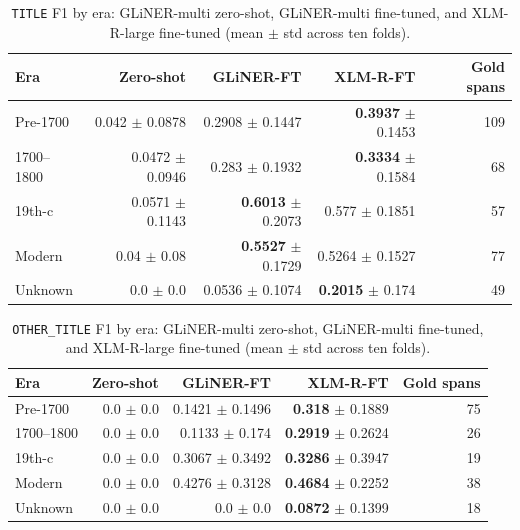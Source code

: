 \begin{table}
  \caption{\texttt{TITLE} F1 by era: GLiNER-multi zero-shot, GLiNER-multi fine-tuned, and XLM-R-large fine-tuned (mean $\pm$ std across ten folds).}
  \label{tab:title-per-era}
  \begin{tabular}{lrrrr}
    \toprule
    Era & Zero-shot & GLiNER-FT & XLM-R-FT & Gold spans \\
    \midrule
    Pre-1700 & 0.042 $\pm$ 0.0878 & 0.2908 $\pm$ 0.1447 & \textbf{0.3937} $\pm$ 0.1453 & 109 \\
    1700--1800 & 0.0472 $\pm$ 0.0946 & 0.283 $\pm$ 0.1932 & \textbf{0.3334} $\pm$ 0.1584 & 68 \\
    19th-c & 0.0571 $\pm$ 0.1143 & \textbf{0.6013} $\pm$ 0.2073 & 0.577 $\pm$ 0.1851 & 57 \\
    Modern & 0.04 $\pm$ 0.08 & \textbf{0.5527} $\pm$ 0.1729 & 0.5264 $\pm$ 0.1527 & 77 \\
    Unknown & 0.0 $\pm$ 0.0 & 0.0536 $\pm$ 0.1074 & \textbf{0.2015} $\pm$ 0.174 & 49 \\
    \bottomrule
  \end{tabular}
\end{table}

\begin{table}
  \caption{\texttt{OTHER\_TITLE} F1 by era: GLiNER-multi zero-shot, GLiNER-multi fine-tuned, and XLM-R-large fine-tuned (mean $\pm$ std across ten folds).}
  \label{tab:other-title-per-era}
  \begin{tabular}{lrrrr}
    \toprule
    Era & Zero-shot & GLiNER-FT & XLM-R-FT & Gold spans \\
    \midrule
    Pre-1700 & 0.0 $\pm$ 0.0 & 0.1421 $\pm$ 0.1496 & \textbf{0.318} $\pm$ 0.1889 & 75 \\
    1700--1800 & 0.0 $\pm$ 0.0 & 0.1133 $\pm$ 0.174 & \textbf{0.2919} $\pm$ 0.2624 & 26 \\
    19th-c & 0.0 $\pm$ 0.0 & 0.3067 $\pm$ 0.3492 & \textbf{0.3286} $\pm$ 0.3947 & 19 \\
    Modern & 0.0 $\pm$ 0.0 & 0.4276 $\pm$ 0.3128 & \textbf{0.4684} $\pm$ 0.2252 & 38 \\
    Unknown & 0.0 $\pm$ 0.0 & 0.0 $\pm$ 0.0 & \textbf{0.0872} $\pm$ 0.1399 & 18 \\
    \bottomrule
  \end{tabular}
\end{table}

